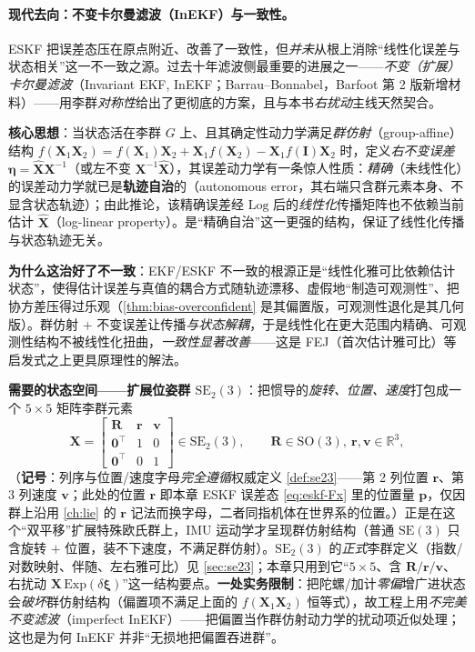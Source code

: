 \paragraph{现代去向：不变卡尔曼滤波（InEKF）与一致性。}
ESKF 把误差态压在原点附近、改善了一致性，但\emph{并未}从根上消除“线性化误差与状态相关”这一不一致之源。过去十年滤波侧最重要的进展之一——\emph{不变（扩展）卡尔曼滤波}（Invariant EKF, InEKF；Barrau--Bonnabel\cite{barrau2017invariant}，Barfoot 第 2 版新增材料）——用李群\emph{对称性}给出了更彻底的方案，且与本书\emph{右扰动}主线天然契合。

\begin{paper}\label{paper:inekf}
\textbf{核心思想}\cite{barrau2017invariant}：当状态活在李群 $G$ 上、且其确定性动力学满足\emph{群仿射}（group-affine）结构 $f(\mathbf{X}_1\mathbf{X}_2)=f(\mathbf{X}_1)\mathbf{X}_2+\mathbf{X}_1 f(\mathbf{X}_2)-\mathbf{X}_1 f(\mathbf{I})\mathbf{X}_2$ 时，定义\emph{右不变误差} $\boldsymbol{\eta}=\hat{\mathbf{X}}\mathbf{X}^{-1}$（或左不变 $\mathbf{X}^{-1}\hat{\mathbf{X}}$），其误差动力学有一条惊人性质：\emph{精确}（未线性化）的误差动力学就已是\textbf{轨迹自治}的（autonomous error，其右端只含群元素本身、不显含状态轨迹）；由此推论，该精确误差经 $\mathrm{Log}$ 后的\emph{线性化}传播矩阵也不依赖当前估计 $\hat{\mathbf{X}}$（log-linear property）。是“精确自治”这一更强的结构，保证了线性化传播与状态轨迹无关。

\textbf{为什么这治好了不一致}：EKF/ESKF 不一致的根源正是“线性化雅可比依赖估计状态”，使得估计误差与真值的耦合方式随轨迹漂移、虚假地“制造可观测性”、把协方差压得过乐观（\cref{thm:bias-overconfident} 是其偏置版，可观测性退化是其几何版）。群仿射 $+$ 不变误差让传播\emph{与状态解耦}，于是线性化在更大范围内精确、可观测性结构不被线性化扭曲，\emph{一致性显著改善}——这是 FEJ（首次估计雅可比）等启发式之上更具原理性的解法。

\textbf{需要的状态空间——扩展位姿群 $\mathrm{SE}_2(3)$}：把惯导的\emph{旋转、位置、速度}打包成一个 $5\times5$ 矩阵李群元素
\[
  \mathbf{X}=\begin{bmatrix}\mathbf{R}&\mathbf{r}&\mathbf{v}\\\mathbf{0}^\top&1&0\\\mathbf{0}^\top&0&1\end{bmatrix}\in\mathrm{SE}_2(3),\qquad
  \mathbf{R}\in\mathrm{SO}(3),\ \mathbf{r},\mathbf{v}\in\mathbb{R}^3,
\]
（\textbf{记号}：列序与位置/速度字母\emph{完全遵循}权威定义 \cref{def:se23}——第 2 列位置 $\mathbf{r}$、第 3 列速度 $\mathbf{v}$；此处的位置 $\mathbf{r}$ 即本章 ESKF 误差态 \cref{eq:eskf-Fx} 里的位置量 $\mathbf{p}$，仅因群上沿用 \cref{ch:lie} 的 $\mathbf{r}$ 记法而换字母，二者同指机体在世界系的位置。）正是在这个“双平移”扩展特殊欧氏群上，IMU 运动学才呈现群仿射结构（普通 $\mathrm{SE}(3)$ 只含旋转 $+$ 位置，装不下速度，不满足群仿射）。$\mathrm{SE}_2(3)$ 的\emph{正式}李群定义（指数/对数映射、伴随、左右雅可比）见 \cref{sec:se23}；本章只用到它“$5\times5$、含 $\mathbf{R}/\mathbf{r}/\mathbf{v}$、右扰动 $\mathbf{X}\,\mathrm{Exp}(\delta\boldsymbol{\xi})$”这一结构要点。\textbf{一处实务限制}：把陀螺/加计\emph{零偏}增广进状态会\emph{破坏}群仿射结构（偏置项不满足上面的 $f(\mathbf{X}_1\mathbf{X}_2)$ 恒等式），故工程上用\emph{不完美不变滤波}（imperfect InEKF）——把偏置当作群仿射动力学的扰动项近似处理；这也是为何 InEKF 并非“无损地把偏置吞进群”。


\end{paper}
